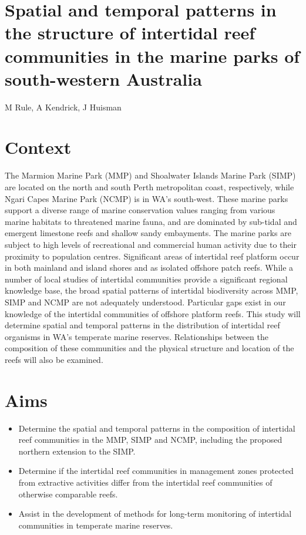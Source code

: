 \documentclass[version=last,
    paper=a4, %
    10pt, %
    usenames,
    dvipsnames,
    oneside, %
    headings=openany, %
    DIV=15 %
]{scrbook}
\begin{document}
\section*{Spatial and temporal patterns in the structure of intertidal reef
communities in the marine parks of south-western Australia
}

M Rule, A Kendrick, J Huisman


\section*{Context}
The Marmion Marine Park (MMP) and Shoalwater Islands Marine Park (SIMP)
are located on the north and south Perth metropolitan coast,
respectively, while Ngari Capes Marine Park (NCMP) is in WA's
south-west. These marine parks support a diverse range of marine
conservation values ranging from various marine habitats to threatened
marine fauna, and are dominated by sub-tidal and emergent limestone
reefs and shallow sandy embayments. The marine parks are subject to high
levels of recreational and commercial human activity due to their
proximity to population centres. Significant areas of intertidal reef
platform occur in both mainland and island shores and as isolated
offshore patch reefs. While a number of local studies of intertidal
communities provide a significant regional knowledge base, the broad
spatial patterns of intertidal biodiversity across MMP, SIMP and NCMP
are not adequately understood. Particular gaps exist in our knowledge of
the intertidal communities of offshore platform reefs. This study will
determine spatial and temporal patterns in the distribution of
intertidal reef organisms in WA's temperate marine reserves.
Relationships between the composition of these communities and the
physical structure and location of the reefs will also be examined.



\section*{Aims}
\begin{itemize}
\itemsep1pt\parskip0pt
\item
  Determine the spatial and temporal patterns in the composition of
  intertidal reef communities in the MMP, SIMP and NCMP, including the
  proposed northern extension to the SIMP.
\item
  Determine if the intertidal reef communities in management zones
  protected from extractive activities differ from the intertidal reef
  communities of otherwise comparable reefs.
\item
  Assist in the development of methods for long-term monitoring of
  intertidal communities in temperate marine reserves.
\end{itemize}
\end{document}
